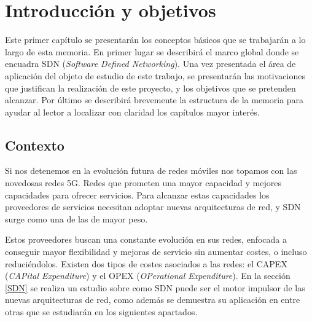 \documentclass[a4paper,11pt]{book}
\begin{document}
\newpage

\thispagestyle{empty}

\tableofcontents %

\cleardoublepage
{} %
\listoffigures %

\cleardoublepage
\renewcommand{\listtablename}{Índice de tablas}
\renewcommand{\tablename}{Tabla}
\listoftables %

\chapter{Introducción y objetivos}\label{cap.introduccion}
Este primer capítulo se presentarán los conceptos básicos que se trabajarán a lo largo de esta memoria. En primer lugar se describirá el marco global donde se encuadra \ac{SDN} (\emph{Software Defined Networking}). Una vez presentada el área de aplicación del objeto de estudio de este trabajo, se presentarán las motivaciones que justifican la realización de este proyecto, y los objetivos que se pretenden alcanzar. Por último se describirá brevemente la estructura de la memoria para ayudar al lector a localizar con claridad los capítulos mayor interés.

\section{Contexto}\label{contexto}
Si nos detenemos en la evolución futura de redes móviles nos topamos con las novedosas redes 5G. Redes que prometen una mayor capacidad y mejores capacidades para ofrecer servicios. Para alcanzar estas capacidades los proveedores de servicios necesitan adoptar nuevas arquitecturas de red, y \ac{SDN} surge como una de las de mayor peso.

Estos proveedores buscan una constante evolución en sus redes, enfocada a conseguir mayor flexibilidad y mejoras de servicio sin aumentar costes, o incluso reduciéndolos. Existen dos tipos de costes asociados a las redes: el \ac{CAPEX} (\emph{CAPital Expenditure}) y el \ac{OPEX} (\emph{OPerational Expenditure}). En la sección \ref{SDN} se realiza un estudio sobre como \ac{SDN} puede ser el motor impulsor de las nuevas arquitecturas de red, como además se demuestra su aplicación en \cite{googleOpenFlow} entre otras que se estudiarán en los siguientes apartados.
\end{document}
